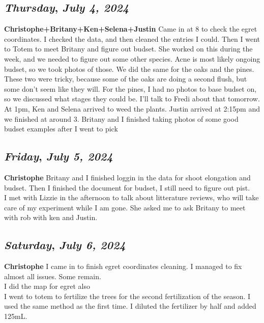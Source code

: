 \def\day{\textit{July 4, 2024}}
\def\weekday{\textit{Thursday}}
\subsection*{\weekday, \day}
\textbf {Christophe+Britany+Ken+Selena+Justin}
Came in at 8 to check the egret coordinates. I checked the data, and then cleaned the entries I could. Then I went to Totem to meet Britany and figure out budset. She worked on this during the week, and we needed to figure out some other species. Acne is most likely ongoing budset, so we took photos of those. We did the same for the oaks and the pines. These two were tricky, because some of the oaks are doing a second flush, but some don't seem like they will. For the pines, I had no photos to base budset on, so we discussed what stages they could be. I'll talk to Fredi about that tomorrow. \\
At 1pm, Ken and Selena arrived to weed the plants. Justin arrived at 2:15pm and we finished at around 3. Britany and I finished taking photos of some good budset examples after I went to pick

\def\day{\textit{July 5, 2024}}
\def\weekday{\textit{Friday}}
\subsection*{\weekday, \day}
\textbf {Christophe}
Britany and I finished loggin in the data for shoot elongation and budset. Then I finished the document for budset, I still need to figure out pist.\\
I met with Lizzie in the afternoon to talk about litterature reviews, who will take care of my experiment while I am gone. She asked me to ask Britany to meet with rob with ken and Justin.

\def\day{\textit{July 6, 2024}}
\def\weekday{\textit{Saturday}}
\subsection*{\weekday, \day}
\textbf {Christophe}
 I came in to finish egret coordinates cleaning. I managed to fix almost all issues. Some remain.\\
 I did the map for egret also\\
 I went to totem to fertilize the trees for the second fertilization of the season. I used the same method as the first time. I diluted the fertilizer by half and added 125mL.

\def\day{\textit{July 8, 2024}}
\def\weekday{\textit{Monday}}
